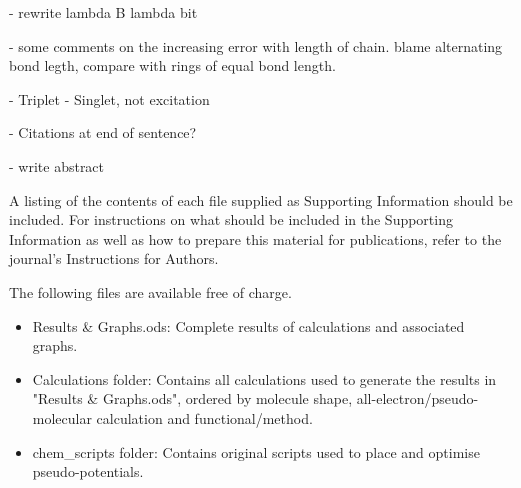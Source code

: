 \documentclass[journal=jctcce,manuscript=article]{achemso}
\begin{document}
- rewrite lambda B lambda bit

- some comments on the increasing error with length of chain. blame alternating bond legth, compare with rings of equal bond length. 

- Triplet - Singlet, not excitation

- Citations at end of sentence? 

- write abstract


\begin{suppinfo}

A listing of the contents of each file supplied as Supporting Information
should be included. For instructions on what should be included in the
Supporting Information as well as how to prepare this material for
publications, refer to the journal's Instructions for Authors.

The following files are available free of charge.
\begin{itemize}
  \item Results \& Graphs.ods: Complete results of calculations and associated graphs.
  \item Calculations folder: Contains all calculations used to generate the results in "Results \& Graphs.ods", ordered by molecule
  shape, all-electron/pseudo-molecular calculation and functional/method.
  \item chem\_scripts folder: Contains original scripts used to place and optimise pseudo-potentials.
\end{itemize}

\end{suppinfo}


\end{document}
